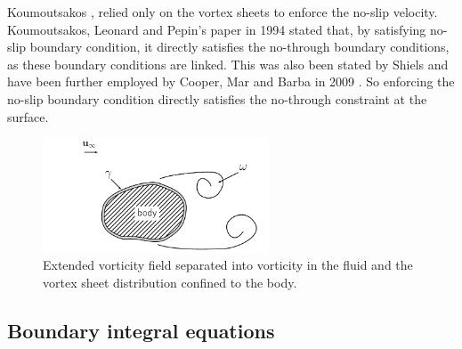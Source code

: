 Koumoutsakos \cite{Koumoutsakos1993b}, relied only on the vortex sheets to enforce the no-slip velocity. Koumoutsakos, Leonard and Pepin's paper in 1994 \cite{Koumoutsakos1994b} stated that, by satisfying no-slip boundary condition, it directly satisfies the no-through boundary conditions, as these boundary conditions are linked. This was also been stated by Shiels \cite{Shiels1998} and have been further employed by Cooper, Mar and Barba in 2009 \cite{Cooper2009a}. So enforcing the no-slip boundary condition directly satisfies the no-through constraint at the surface.

	\begin{figure}[t]
	\centering
	\includegraphics[width=0.6\textwidth]{figures/lagrangian/noSlipVorticityField.pdf}
	\caption{Extended vorticity field separated into vorticity in the fluid and the vortex sheet distribution confined to the body.}
	\label{fig:noSlipVorticityField}
	\end{figure}

\subsection{Boundary integral equations}

